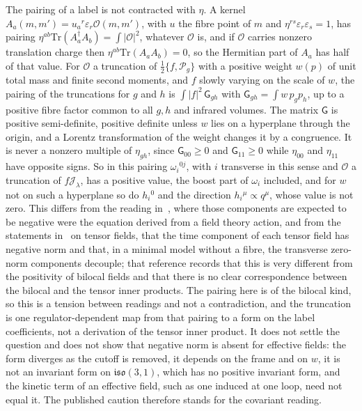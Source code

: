 The pairing of a label is not contracted with \(\eta\). A kernel \(A_a(m,m')=u_a{}^r\varepsilon_r\mathcal O(m,m')\), with \(u\) the fibre point of \(m\) and \(\eta^{rs}\varepsilon_r\varepsilon_s=1\), has pairing \(\eta^{ab}\mathrm{Tr}(A_a^\dagger A_b)=\int|\mathcal O|^2\), whatever \(\mathcal O\) is, and if \(\mathcal O\) carries nonzero translation charge then \(\eta^{ab}\mathrm{Tr}(A_aA_b)=0\), so the Hermitian part of \(A_a\) has half of that value. For \(\mathcal O\) a truncation of \(\tfrac12\{f,\mathcal P_g\}\) with a positive weight \(w(p)\) of unit total mass and finite second moments, and \(f\) slowly varying on the scale of \(w\), the pairing of the truncations for \(g\) and \(h\) is \(\int|f|^2\,\mathsf G_{gh}\) with \(\mathsf G_{gh}=\int w\,p_gp_h\), up to a positive fibre factor common to all \(g,h\) and infrared volumes. The matrix \(\mathsf G\) is positive semi-definite, positive definite unless \(w\) lies on a hyperplane through the origin, and a Lorentz transformation of the weight changes it by a congruence. It is never a nonzero multiple of \(\eta_{gh}\), since \(\mathsf G_{00}\ge0\) and \(\mathsf G_{11}\ge0\) while \(\eta_{00}\) and \(\eta_{11}\) have opposite signs. So in this pairing \(\omega_i{}^{0j}\), with \(i\) transverse in this sense and \(\mathcal O\) a truncation of \(f\mathcal J_\lambda\), has a positive value, the boost part of \(\omega_i\) included, and for \(w\) not on such a hyperplane so do \(h_i{}^0\) and the direction \(h_i{}^\mu\propto q^\mu\), whose value is not zero. This differs from the reading in~\cite{FurutaHanadaKawaiKimura2007}, where those components are expected to be negative were the equation derived from a field theory action, and from the statements in~\cite{HoKawaiSteinacker2025} on tensor fields, that the time component of each tensor field has negative norm and that, in a minimal model without a fibre, the transverse zero-norm components decouple; that reference records that this is very different from the positivity of bilocal fields and that there is no clear correspondence between the bilocal and the tensor inner products. The pairing here is of the bilocal kind, so this is a tension between readings and not a contradiction, and the truncation is one regulator-dependent map from that pairing to a form on the label coefficients, not a derivation of the tensor inner product. It does not settle the question and does not show that negative norm is absent for effective fields: the form diverges as the cutoff is removed, it depends on the frame and on \(w\), it is not an invariant form on \(\mathfrak{iso}(3,1)\), which has no positive invariant form, and the kinetic term of an effective field, such as one induced at one loop, need not equal it. The published caution therefore stands for the covariant reading.

